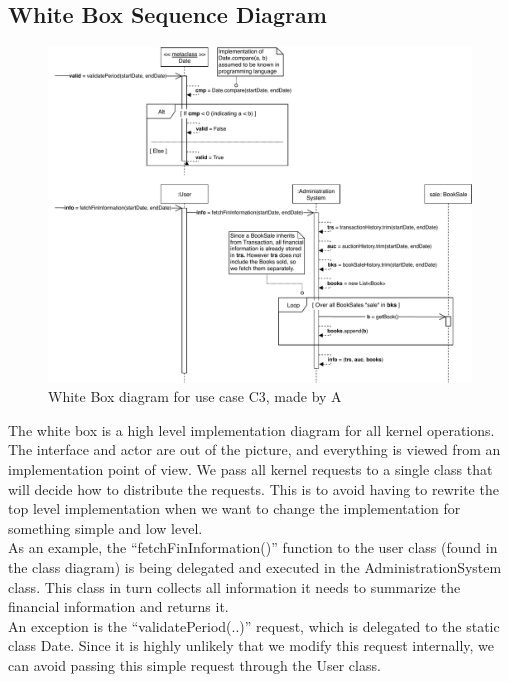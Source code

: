 \subsection*{White Box Sequence Diagram}
\begin{figure}[H]
	\centering
	\includegraphics[scale=.70]{uml/SD-wb-finInformation.pdf}
	\caption*{White Box diagram for use case C3, made by A}
\end{figure}
The white box is a high level implementation diagram for all kernel operations. The interface and actor are out of the picture, and everything is viewed from an implementation point of view. We pass all kernel requests to a single class that will decide how to distribute the requests. This is to avoid having to rewrite the top level implementation when we want to change the implementation for something simple and low level.\\As an example, the ``fetchFinInformation()'' function to the user class (found in the class diagram) is being delegated and executed in the AdministrationSystem class. This class in turn collects all information it needs to summarize the financial information and returns it.\\
An exception is the ``validatePeriod(..)'' request, which is delegated to the static class Date. Since it is highly unlikely that we modify this request internally, we can avoid passing this simple request through the User class.